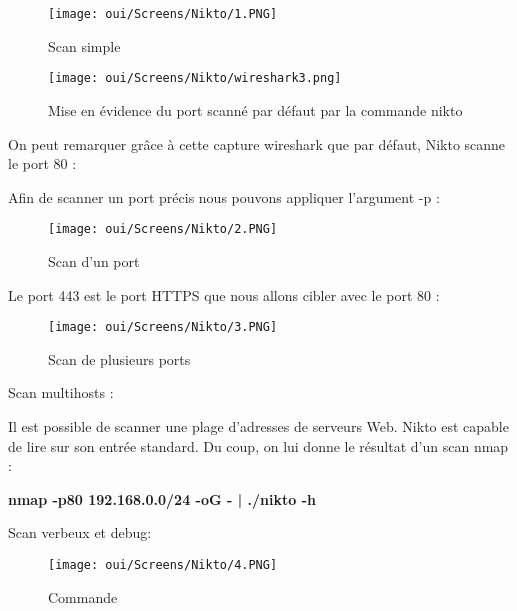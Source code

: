 \begin{figure}[htp!]
  \centering
  \setlength\figureheight{7cm}
  \setlength\figurewidth{9cm}
  \texttt{[image: oui/Screens/Nikto/1.PNG]}
  \caption{Scan simple}
  \label{fig:courbe-tikz}
\end{figure}

\begin{figure}[htp!]
  \centering
  \setlength\figureheight{7cm}
  \setlength\figurewidth{9cm}
  \texttt{[image: oui/Screens/Nikto/wireshark3.png]}
  \caption{Mise en évidence du port scanné par défaut par la commande nikto}
  \label{fig:courbe-tikz}
\end{figure}

On peut remarquer grâce à cette capture wireshark que par défaut, Nikto scanne le port 80 :


\newpage
Afin de scanner un port précis nous pouvons appliquer l'argument -p :

\begin{figure}[htp!]
  \centering
  \setlength\figureheight{7cm}
  \setlength\figurewidth{9cm}
  \texttt{[image: oui/Screens/Nikto/2.PNG]}
  \caption{Scan d'un port}
  \label{fig:courbe-tikz}
\end{figure}

Le port 443 est le port HTTPS que nous allons cibler avec le port 80 :

\begin{figure}[htp!]
  \centering
  \setlength\figureheight{7cm}
  \setlength\figurewidth{9cm}
  \texttt{[image: oui/Screens/Nikto/3.PNG]}
  \caption{Scan de plusieurs ports}
  \label{fig:courbe-tikz}
\end{figure}

\newpage
Scan multihosts :


Il est possible de scanner une plage d’adresses de serveurs Web. Nikto est capable de lire sur son entrée standard. Du coup, on lui donne le résultat d’un scan nmap :\\
\begin{center}   
\textbf{nmap -p80 192.168.0.0/24 -oG - | ./nikto -h}
\end{center}

Scan verbeux et debug:

\begin{figure}[htp!]
  \centering
  \setlength\figureheight{7cm}
  \setlength\figurewidth{9cm}
  \texttt{[image: oui/Screens/Nikto/4.PNG]}
  \caption{Commande}
  \label{fig:courbe-tikz}
\end{figure}

